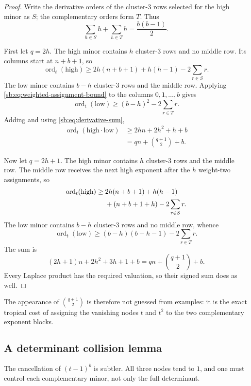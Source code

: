 \documentclass[11pt]{article}
\theoremstyle{definition}
\theoremstyle{remark}
\newcommand{\ord}{\operatorname{ord}}
\theoremstyle{definition}
\theoremstyle{plain}
\numberwithin{equation}{section}
\begin{document}
\begin{proof}
Write the derivative orders of the cluster-$3$ rows selected for the high
minor as $S$; the complementary orders form $T$.  Thus
\begin{equation}
 \sum_{h\in S}h+\sum_{h\in T}h=\frac{b(b-1)}2.
 \label{sb:eq:derivative-sum}
\end{equation}

First let $q=2h$.  The high minor contains $h$ cluster-$3$ rows and no middle
row.  Its columns start at $n+b+1$, so
\begin{equation}
 \ord_t(\text{high})\ge
 2h(n+b+1)+h(h-1)-2\sum_{r\in S}r.
 \label{sb:eq:even-high}
\end{equation}
The low minor contains $b-h$ cluster-$3$ rows and the middle row.  Applying
\eqref{sb:eq:weighted-assignment-bound} to the columns $0,1,\ldots,b$ gives
\begin{equation}
 \ord_t(\text{low})\ge
 (b-h)^2-2\sum_{r\in T}r.
 \label{sb:eq:even-low}
\end{equation}
Adding and using \eqref{sb:eq:derivative-sum},
\begin{align*}
 \ord_t(\text{high}\cdot\text{low})
 &\ge 2hn+2h^2+h+b\\
 &=qn+\binom{q+1}{2}+b.
\end{align*}

Now let $q=2h+1$.  The high minor contains $h$ cluster-$3$ rows and the
middle row.  The middle row receives the next high exponent after the $h$
weight-two assignments, so
\begin{align}
 \ord_t(\text{high})\ge{}&
 2h(n+b+1)+h(h-1)\notag\\
 &+(n+b+1+h)-2\sum_{r\in S}r.
 \label{sb:eq:odd-high}
\end{align}
The low minor contains $b-h$ cluster-$3$ rows and no middle row, whence
\begin{equation}
 \ord_t(\text{low})\ge
 (b-h)(b-h-1)-2\sum_{r\in T}r.
 \label{sb:eq:odd-low}
\end{equation}
The sum is
\[
 (2h+1)n+2h^2+3h+1+b
 =qn+\binom{q+1}{2}+b.
\]
Every Laplace product has the required valuation, so their signed sum does as
well.
\end{proof}

The appearance of $\binom{q+1}{2}$ is therefore not guessed from examples: it
is the exact tropical cost of assigning the vanishing nodes $t$ and $t^2$ to
the two complementary exponent blocks.

\subsection{A determinant collision lemma}
The cancellation of $(t-1)^b$ is subtler.  All three nodes tend to $1$, and
one must control each complementary minor, not only the full determinant.
\end{document}
